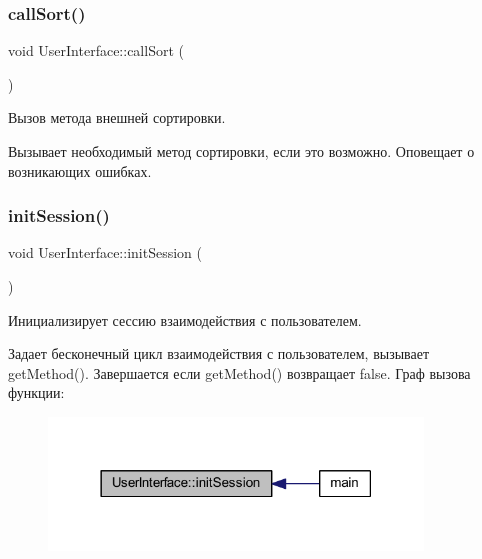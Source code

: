 \subsubsection{\texorpdfstring{call\+Sort()}{callSort()}}
{\footnotesize\ttfamily void User\+Interface\+::call\+Sort (\begin{DoxyParamCaption}{ }\end{DoxyParamCaption})\hspace{0.3cm}{\ttfamily [private]}}



Вызов метода внешней сортировки. 

Вызывает необходимый метод сортировки, если это возможно. Оповещает о возникающих ошибках. \hypertarget{class_user_interface_a6c7f9ef9faa40eaf4760d57e89228786}{}\label{class_user_interface_a6c7f9ef9faa40eaf4760d57e89228786} 
\subsubsection{\texorpdfstring{init\+Session()}{initSession()}}
{\footnotesize\ttfamily void User\+Interface\+::init\+Session (\begin{DoxyParamCaption}{ }\end{DoxyParamCaption})}



Инициализирует сессию взаимодействия с пользователем. 

Задает бесконечный цикл взаимодействия с пользователем, вызывает get\+Method(). Завершается если get\+Method() возвращает false. Граф вызова функции\+:\nopagebreak
\begin{figure}[H]
\begin{center}
\leavevmode
\includegraphics[width=282pt]{class_user_interface_a6c7f9ef9faa40eaf4760d57e89228786_icgraph}
\end{center}
\end{figure}
\hypertarget{class_user_interface_af9043ca8df15d62de342d7cbfa2eb3d7}{}\label{class_user_interface_af9043ca8df15d62de342d7cbfa2eb3d7} 
